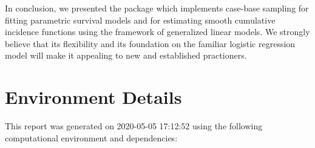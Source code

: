 \documentclass[
]{jss}
\begin{document}
In conclusion, we presented the  package 
which implements case-base sampling for fitting parametric survival
models and for estimating smooth cumulative incidence functions using
the framework of generalized linear models. We strongly believe that its
flexibility and its foundation on the familiar logistic regression model
will make it appealing to new and established practioners.

\hypertarget{environment-details}{%
\section{Environment Details}\label{environment-details}}

This report was generated on 2020-05-05 17:12:52 using the following
computational environment and dependencies:
\end{document}
